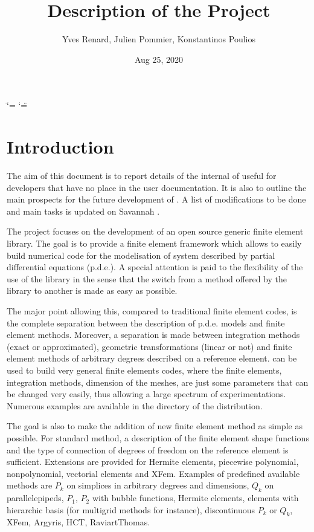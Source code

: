 \documentclass[a4paper,11pt,english]{sphinxmanual}
\title{Description of the Project}
\date{Aug 25, 2020}
\author{Yves Renard, Julien Pommier, Konstantinos Poulios}
\begin{document}
\ifdefined\shorthandoff
  \ifnum\catcode`\=\string=\active\shorthandoff{=}\fi
  \ifnum\catcode`\"=\active{}\fi
\fi

\pagestyle{empty}
\sphinxmaketitle
\pagestyle{plain}
\sphinxtableofcontents
\pagestyle{normal}
\label{\detokenize{project/index::doc}}



\chapter{Introduction}
\label{\detokenize{project/intro:introduction}}\label{\detokenize{project/intro:dp-intro}}\label{\detokenize{project/intro::doc}}
The aim of this document is to report details of the internal of 
useful for developers that have no place in the user documentation.
It is also to outline the main prospects for the future development
of . A list of modifications to be done and main tasks is updated
on Savannah .

The  project focuses on the development of an open source generic
finite element library.
The goal is to provide a finite element framework which allows to
easily build numerical code for the modelisation of system described
by partial differential equations (p.d.e.). A special attention is paid
to the flexibility of the use of the library in the sense that the
switch from a method offered by the library to another is made as easy
as possible.

The major point allowing this, compared to traditional finite element
codes, is the complete separation between the description of p.d.e.
models and finite element methods. Moreover, a separation is made
between integration methods (exact or approximated), geometric
transformations (linear or not) and finite element methods of
arbitrary degrees described on a reference element.  can
be used to build very general finite elements codes, where the
finite elements, integration methods, dimension of the meshes,
are just some parameters that can
be changed very easily, thus allowing a large spectrum of experimentations.
Numerous examples are available in the  directory of the
distribution.

The goal is also to make the addition of new finite element method
as simple as possible. For standard method, a description of the
finite element shape functions and the type of connection of degrees
of freedom on the reference element is sufficient. Extensions are
provided for Hermite elements, piecewise polynomial, non\sphinxhyphen{}polynomial,
vectorial elements and XFem. Examples of predefined
available methods are \(P_k\) on simplices in arbitrary degrees and
dimensions, \(Q_k\) on parallelepipeds, \(P_1\), \(P_2\)
with bubble functions, Hermite elements, elements with hierarchic
basis (for multigrid methods for instance),
discontinuous \(P_k\) or \(Q_k\), XFem, Argyris, HCT, Raviart\sphinxhyphen{}Thomas.
\end{document}
